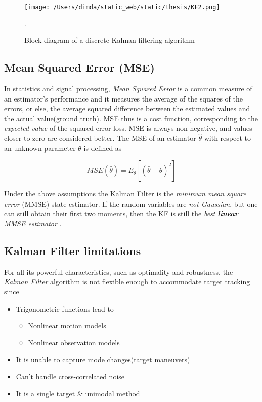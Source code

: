 \begin{figure}[H]
	\centering
	\texttt{[image: /Users/dimda/static\_web/static/thesis/KF2.png]}
	\caption{Block diagram of a discrete Kalman filtering algorithm}.
	\label{fig:state_vector}
\end{figure}

\subsection{Mean Squared Error (MSE)}
In statistics and signal processing, \emph{Mean Squared Error} is a common measure of an estimator's performance and it measures the average of the squares of the errors, or else, the average squared difference between the estimated values and the actual value(ground truth). MSE thus is a cost function, corresponding to the \emph{expected value} of the squared error loss. MSE is always non-negative, and values closer to zero are considered better. The MSE of an estimator $\hat{\theta}$ with respect to an unknown parameter $\theta$ is defined as 

\[ MSE(\hat{\theta}) = E_{\theta}\left[(\hat{\theta}-\theta)^2\right] \]

Under the above assumptions the Kalman Filter is the \emph{minimum mean square error }(MMSE) state estimator. If the random variables are \emph{not Gaussian}, but one can still obtain their first two moments, then the KF is still the \emph{best \textbf{linear} MMSE estimator} \cite{Shalom1995}.

\subsection{Kalman Filter limitations}

For all its powerful characteristics, such as optimality and robustness, the \emph{Kalman Filter} algorithm is not flexible enough to accommodate target tracking\cite{Shalom1995} since

\begin{itemize}
	\item Trigonometric functions lead to
		\begin{itemize}
			\item Nonlinear motion models
			\item Nonlinear observation models
		\end{itemize}
	\item It is unable to capture mode changes(target maneuvers)
	\item Can't handle cross-correlated noise
	\item It is a single target \& unimodal method
\end{itemize}

